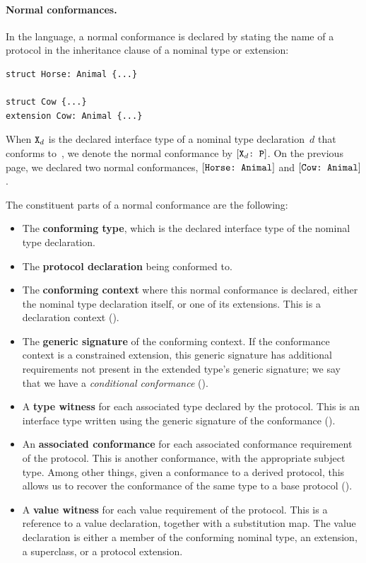 \documentclass[../generics]{subfiles}
\begin{document}
\paragraph{Normal conformances.} In the language, a normal conformance is declared by stating the name of a protocol in the inheritance clause of a nominal type or extension:
\begin{Verbatim}
struct Horse: Animal {...}

struct Cow {...}
extension Cow: Animal {...}
\end{Verbatim}

When $\texttt{X}_d$ is the declared interface type of a nominal type declaration~$d$ that conforms to~\tP, we denote the normal conformance by $[\texttt{$\texttt{X}_d$:~P}]$. On the previous page, we declared two normal conformances, $[\texttt{Horse:~Animal}]$ and $[\texttt{Cow:~Animal}]$.

The constituent parts of a normal conformance are the following:
\begin{itemize}
\item The \textbf{conforming type}, which is the declared interface type of the nominal type declaration.
\item The \textbf{protocol declaration} being conformed to.
\item The \textbf{conforming context} where this normal conformance is declared, either the nominal type declaration itself, or one of its extensions. This is a declaration context ().
\item The \textbf{generic signature} of the conforming context. If the conformance context is a constrained extension, this generic signature has additional requirements not present in the extended type's generic signature; we say that we have a \emph{conditional conformance} ().
\item A \textbf{type witness} for each associated type declared by the protocol. This is an interface type written using the generic signature of the conformance ().
\item An \textbf{associated conformance} for each associated conformance requirement of the protocol. This is another conformance, with the appropriate subject type. Among other things, given a conformance to a derived protocol, this allows us to recover the conformance of the same type to a base protocol ().
\item A \textbf{value witness} for each value requirement of the protocol. This is a reference to a value declaration, together with a substitution map. The value declaration is either a member of the conforming nominal type, an extension, a superclass, or a protocol extension.
\end{itemize}
\end{document}
